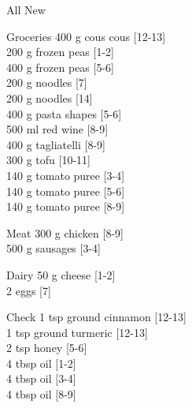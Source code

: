 \begin{menu}{All New}
\begin{shoppinglist}{Groceries}
      400 g cous cous 
        {\scriptsize[12-13]}\\
      200 g frozen peas 
        {\scriptsize[1-2]}\\
      400 g frozen peas 
        {\scriptsize[5-6]}\\
      200 g noodles 
        {\scriptsize[7]}\\
      200 g noodles 
        {\scriptsize[14]}\\
      400 g pasta shapes 
        {\scriptsize[5-6]}\\
      500 ml red wine 
        {\scriptsize[8-9]}\\
      400 g tagliatelli 
        {\scriptsize[8-9]}\\
      300 g tofu 
        {\scriptsize[10-11]}\\
      140 g tomato puree 
        {\scriptsize[3-4]}\\
      140 g tomato puree 
        {\scriptsize[5-6]}\\
      140 g tomato puree 
        {\scriptsize[8-9]}\\
      \end{shoppinglist}%
      \par\vfil %
      \begin{shoppinglist}{Meat}
      300 g chicken 
        {\scriptsize[8-9]}\\
      500 g sausages 
        {\scriptsize[3-4]}\\
      \end{shoppinglist}%
      \begin{shoppinglist}{Dairy}
      50 g cheese 
        {\scriptsize[1-2]}\\
      2  eggs 
        {\scriptsize[7]}\\
      \end{shoppinglist}%
      \par\vfil %
      \vfil\clearpage %
      \begin{shoppinglist}{Check}
      1 tsp ground cinnamon 
        {\scriptsize[12-13]}\\
      1 tsp ground turmeric 
        {\scriptsize[12-13]}\\
      2 tsp honey 
        {\scriptsize[5-6]}\\
      4 tbsp oil 
        {\scriptsize[1-2]}\\
      4 tbsp oil 
        {\scriptsize[3-4]}\\
      4 tbsp oil 
        {\scriptsize[8-9]}\\

\end{shoppinglist}
\end{menu}
